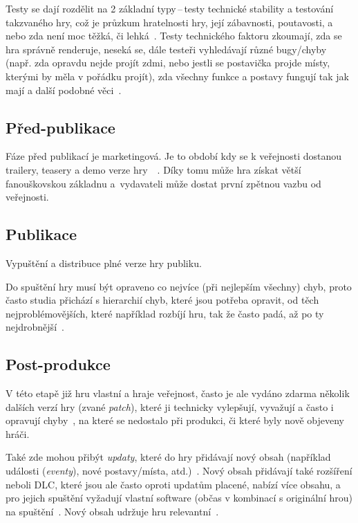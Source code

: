 Testy se dají rozdělit na 2 základní typy\,--\,testy technické stability a testování takzvaného  hry, což je průzkum hratelnosti hry, její zábavnosti, poutavosti, a nebo zda není moc těžká, či lehká~\cite{GameMaker_development}. Testy technického faktoru zkoumají, zda se hra správně renderuje, neseká se, dále testeři vyhledávají různé bugy/chyby (např. zda opravdu nejde projít zdmi, nebo jestli se postavička projde místy, kterými by měla v pořádku projít), zda všechny funkce a postavy fungují tak jak mají a další podobné věci~\cite{g2_game_development}.

\subsection*{Před-publikace}
Fáze před publikací je marketingová. Je to období kdy se k veřejnosti dostanou trailery, teasery a demo verze hry~~\cite{GameMaker_development}. Díky tomu může hra získat větší fanouškovskou základnu a~vydavateli může dostat první zpětnou vazbu od veřejnosti.

\subsection*{Publikace}
Vypuštění a distribuce plné verze hry publiku.

Do spuštění hry musí být opraveno co nejvíce (při nejlepším všechny) chyb, proto často studia přichází s hierarchií chyb, které jsou potřeba opravit, od těch nejproblémovějších, které například rozbíjí hru, tak že často padá, až po ty nejdrobnější~\cite{g2_game_development}.

\subsection*{Post-produkce}
V této etapě již hru vlastní a hraje veřejnost, často je ale vydáno zdarma několik dalších verzí hry (zvané \textit{patch}), které ji technicky vylepšují, vyvažují a často i opravují chyby~\cite{novak2011game}, na které se nedostalo při produkci, či které byly nově objeveny hráči. 

Také zde mohou přibýt \textit{updaty}, které do hry přidávají nový obsah (například události (\textit{eventy}), nové postavy/místa, atd.)~\cite{g2_game_development}. Nový obsah přidávají také rozšíření neboli DLC, které jsou ale často oproti updatům placené, nabízí více obsahu, a pro jejich spuštění vyžadují vlastní software (občas v kombinací s originální hrou) na spuštění~\cite{novak2011game}. Nový obsah udržuje hru relevantní~\cite{GameMaker_development}.

